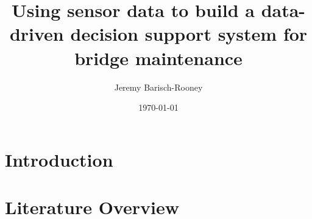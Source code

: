 \documentclass[11pt]{article}
\author{Jeremy Barisch-Rooney}
\date{\today}
\title{Using sensor data to build a data-driven decision support system for bridge maintenance}
\begin{document}
\maketitle
\tableofcontents


\section{Introduction}
\label{sec:orgc837a93}
\section{Literature Overview}
\label{sec:orgf2d9c9b}
\end{document}
